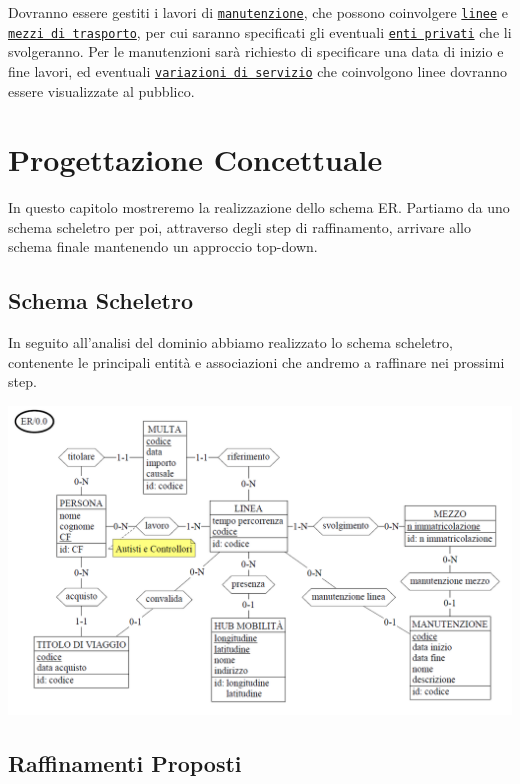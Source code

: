\documentclass[12pt,a4paper]{report}
\begin{document}
Dovranno essere gestiti i lavori di \underline{\texttt{manutenzione}}, che possono coinvolgere \underline{\texttt{linee}} e \underline{\texttt{mezzi di trasporto}}, per cui saranno specificati gli eventuali \underline{\texttt{enti privati}} che li svolgeranno. Per le manutenzioni sarà richiesto di specificare una data di inizio e fine lavori, ed eventuali \underline{\texttt{variazioni di servizio}} che coinvolgono linee dovranno essere visualizzate al pubblico.

\chapter{Progettazione Concettuale}
In questo capitolo mostreremo la realizzazione dello schema ER. Partiamo da uno schema scheletro per poi, attraverso degli step di raffinamento, arrivare allo schema finale mantenendo un approccio top-down.
\section{Schema Scheletro}
In seguito all'analisi del dominio abbiamo realizzato lo schema scheletro, contenente le principali entità e associazioni che andremo a raffinare nei prossimi step.\\

\begin{centering}
\includegraphics[width=1.0\textwidth]{prog_conc/Scheletro}
\end{centering}

\section{Raffinamenti Proposti}
\end{document}
